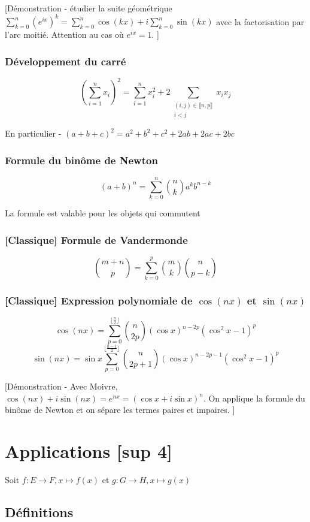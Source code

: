 \documentclass[openany]{book}
\begin{document}
[Démonstration - étudier la suite géométrique $ \sum_{k=0}^{n} (e^{ix})^k = \sum_{k=0}^n\cos{(kx)} + i\sum_{k=0}^n\sin{(kx)} $ avec la factorisation par l'arc moitié. Attention au cas où $ e^{ix} = 1 $. ]

\subsubsection{Développement du carré}
\[ (\sum_{i=1}^n x_i)^2 = \sum_{i=1}^n x_i^2 + 2\sum_{\substack{(i,j)\in\llbracket n , p \rrbracket \\ i<j} }x_ix_j \]

\noindent En particulier - $ (a+b+c)^2 = a^2 + b^2 + c^2 + 2ab + 2ac + 2bc $

\subsubsection{Formule du binôme de Newton}
\[ (a+b)^n = \sum_{k=0}^{n}\binom{n}{k} a^kb^{n-k} \]

\noindent La formule est valable pour les objets qui commutent

\subsubsection{[Classique] Formule de Vandermonde}
\[ \binom{m+n}{p} = \sum_{k=0}^p \binom{m}{k} \binom{n}{p-k}  \]


\subsubsection{[Classique] Expression polynomiale de $\cos{(nx)}$ et $\sin{(nx)}$}
\[ \cos{(nx)} = \sum_{p=0}^{\lfloor\frac{n}{2}\rfloor} \binom{n}{2p}(\cos{x})^{n-2p}(\cos^2{x} -1)^p \]
\[ \sin{(nx)} = \sin{x}\sum_{p=0}^{\lfloor\frac{n-1}{2}\rfloor} \binom{n}{2p+1}(\cos{x})^{n-2p-1}(\cos^2{x} -1)^p \]

[Démonstration - Avec Moivre, 
$ \cos{(nx)} + i\sin{(nx)} = e^{nx} = (\cos{x} + i\sin{x})^n $. On applique la formule du binôme de Newton et on sépare les termes paires et impaires. ]
\clearpage
\section{Applications [sup 4]}
Soit $ f: E \to F, x\mapsto f(x) $ et $ g: G \to H, x\mapsto g(x)$ 
\subsection{Définitions}
\end{document}
